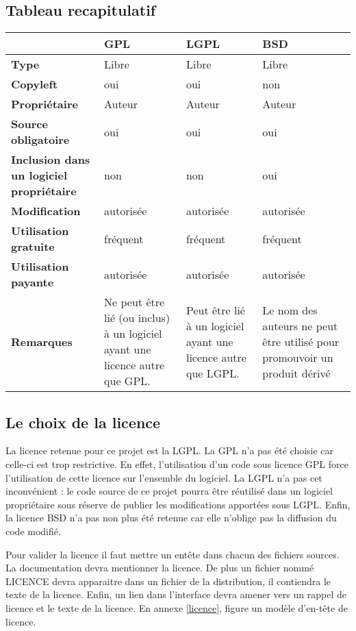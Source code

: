 	\subsection{Tableau recapitulatif}
		\begin{tabular}{|p{3cm}|p{3cm}|p{3cm}|p{3cm}|}
			\hline                 
			& \textbf{GPL} & \textbf{LGPL} & \textbf{BSD} \\              
			\hline                 
			\textbf{Type} & Libre & Libre & Libre \\
			\hline                 
			\textbf{Copyleft} & oui & oui & non \\
			\hline                 
			\textbf{Propriétaire} & Auteur & Auteur & Auteur \\
			\hline                 
			\textbf{Source obligatoire} & oui & oui & oui \\
			\hline                 
			\textbf{Inclusion dans un logiciel propriétaire} & non & non & oui \\
			\hline                 
			\textbf{Modification} & autorisée & autorisée & autorisée \\
			\hline                 
			\textbf{Utilisation gratuite} & fréquent & fréquent & fréquent \\
			\hline                 
			\textbf{Utilisation payante} & autorisée & autorisée & autorisée \\
			\hline                 
			\textbf{Remarques} & Ne peut être lié (ou inclus) à un logiciel ayant une licence autre que GPL. & Peut être lié à un logiciel ayant une licence autre que LGPL. & Le nom des auteurs ne peut être utilisé pour promouvoir un produit dérivé \\
			\hline  
		\end{tabular}


	\subsection{Le choix de la licence}
		La licence retenue pour ce projet est la LGPL. La GPL n’a pas été choisie car celle-ci est trop restrictive. En effet, l’utilisation d’un code sous licence GPL force l’utilisation de cette licence sur l’ensemble du logiciel. La LGPL n’a pas cet inconvénient : le code source de ce projet pourra être réutilisé dans un logiciel propriétaire sous réserve de publier les modifications apportées sous LGPL. Enfin, la licence BSD n’a pas non plus été retenue car elle n’oblige pas la diffusion du code modifié.

		Pour valider la licence il faut mettre un entête dans chacun des fichiers sources. La documentation devra mentionner la licence. De plus un fichier nommé LICENCE devra apparaitre dans un fichier de la distribution, il contiendra le texte de la licence. Enfin, un lien dans l’interface devra amener vers un rappel de licence et le texte de la licence. En annexe \ref{licence}, figure un modèle d’en-tête de licence.